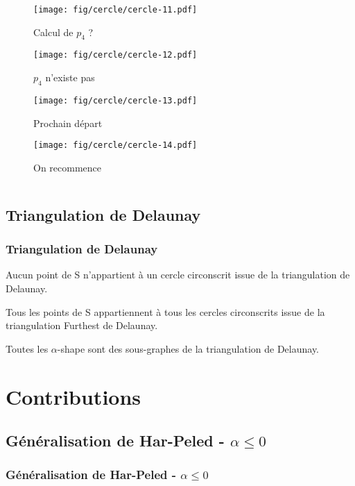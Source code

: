 \documentclass{beamer}
\begin{document}
\begin{frame}
\begin{columns}[t]
\begin{column}{6cm}
{
  \begin{figure}[h!]
    \centering
    \texttt{[image: fig/cercle/cercle-11.pdf]}
    \caption{Calcul de $p_{4}$ ?}
\end{figure}
}
{
  \begin{figure}[h!]
    \centering
    \texttt{[image: fig/cercle/cercle-12.pdf]}
    \caption{$p_{4}$ n'existe pas}
\end{figure}
}
{
  \begin{figure}[h!]
    \centering
    \texttt{[image: fig/cercle/cercle-13.pdf]}
    \caption{Prochain départ}
\end{figure}
}
{
  \begin{figure}[h!]
    \centering
    \texttt{[image: fig/cercle/cercle-14.pdf]}
    \caption{On recommence}
\end{figure}
}



  \end{column}
\end{columns} 

\end{frame}
    
\subsection{Triangulation de Delaunay}  
\begin{frame}
\frametitle{Triangulation de Delaunay}
Aucun point de S n'appartient à un cercle circonscrit issue de la triangulation de Delaunay.

Tous les points de S appartiennent à tous les cercles circonscrits issue de la triangulation Furthest de Delaunay.

Toutes les $\alpha$-shape sont des sous-graphes de la triangulation de Delaunay.

\end{frame}

\section{Contributions}

\subsection{Généralisation de Har-Peled - $\alpha \leq 0$}
\begin{frame}
\frametitle{Généralisation de Har-Peled - $\alpha \leq 0$}

\end{frame}
\end{document}
